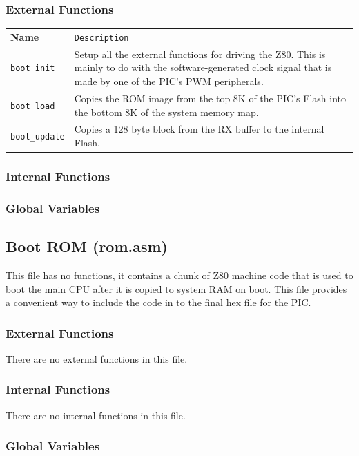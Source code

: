 \documentclass[a4paper,10pt]{book}
\begin{document}
\subsubsection{External Functions}
\begin{tabular}{lp{8cm}}
 \textbf{Name}&\texttt{Description}\\
 \texttt{boot\_init}&Setup all the external functions for driving the Z80.  This is mainly to do with the software-generated clock signal that is made by one of the PIC's PWM peripherals.\\
 \texttt{boot\_load}&Copies the ROM image from the top 8K of the PIC's Flash into the bottom 8K of the system memory map.\\
 \texttt{boot\_update}&Copies a 128 byte block from the RX buffer to the internal Flash.\\
\end{tabular}


\subsubsection{Internal Functions}

\subsubsection{Global Variables}

\subsection{Boot ROM (rom.asm)}
This file has no functions, it contains a chunk of Z80 machine code that is used to boot the main CPU after it is copied to system RAM on boot.  This file provides a convenient way to include the code in to the final hex file for the PIC.

\subsubsection{External Functions}
There are no external functions in this file.

\subsubsection{Internal Functions}
There are no internal functions in this file.

\subsubsection{Global Variables}
\end{document}
